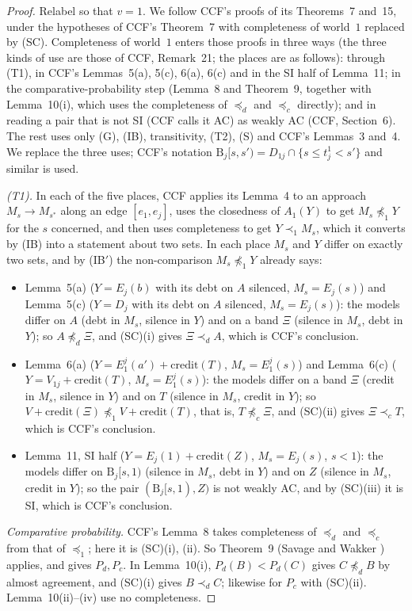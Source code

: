 \documentclass[11pt]{article}
\theoremstyle{definition}\newtheorem{definition}[theorem]{Definition}
\theoremstyle{remark}\newtheorem{remark}[theorem]{Remark}
\newcommand{\cred}{\mathrm{credit}}
\newcommand{\Band}{\mathrm B}
\begin{document}
\begin{proof}
Relabel so that $v=1$. We follow CCF's proofs of its Theorems~7 and~15,
under the hypotheses of CCF's Theorem~7 with completeness of world~$1$
replaced by (SC). Completeness of world~$1$ enters those proofs in
three ways (the three kinds of use are those of CCF, Remark~21; the places are as follows): through (T1), in CCF's Lemmas~5(a), 5(c), 6(a),
6(c) and in the SI half of Lemma~11; in the comparative-probability step
(Lemma~8 and Theorem~9, together with Lemma~10(i), which uses the
completeness of $\preceq_d$ and $\preceq_c$ directly); and in reading a pair
that is not SI (CCF calls it AC) as weakly AC (CCF, Section~6). The rest uses only (G), (IB), transitivity,
(T2), (S) and CCF's Lemmas~3 and~4. We replace the three uses; CCF's
notation $\Band_j[s,s')=D_{1j}\cap\{s\le t^1_j<s'\}$ and similar is used.

\emph{(T1).} In each of the five places, CCF applies its Lemma~4 to an
approach $M_s\to M_{s^*}$ along an edge $[e_1,e_j]$, uses the closedness of
$A_1(Y)$ to get $M_s\not\preceq_1Y$ for the $s$ concerned, and then uses
completeness to get $Y\prec_1M_s$, which it converts by (IB) into a
statement about two sets. In each place $M_s$ and $Y$ differ on exactly two
sets, and by (IB$'$) the non-comparison $M_s\not\preceq_1Y$ already says:
\begin{itemize}[leftmargin=*,itemsep=1pt]
\item Lemma~5(a) ($Y=E_j(b)$ with its debt on $A$ silenced, $M_s=E_j(s)$)
and Lemma~5(c) ($Y=D_j$ with its debt on $A$ silenced, $M_s=E_j(s)$): the
models differ on $A$ (debt in $M_s$, silence in $Y$) and on a band $\Xi$
(silence in $M_s$, debt in $Y$); so $A\not\preceq_d\Xi$, and (SC)(i) gives
$\Xi\prec_dA$, which is CCF's conclusion.
\item Lemma~6(a) ($Y=E^j_1(a')+\cred(T)$, $M_s=E^j_1(s)$) and Lemma~6(c)
($Y=V_{1j}+\cred(T)$, $M_s=E^j_1(s)$): the models differ on a band $\Xi$
(credit in $M_s$, silence in $Y$) and on $T$ (silence in $M_s$, credit in
$Y$); so $V+\cred(\Xi)\not\preceq_1V+\cred(T)$, that is, $T\not\preceq_c\Xi$,
and (SC)(ii) gives $\Xi\prec_cT$, which is CCF's conclusion.
\item Lemma~11, SI half ($Y=E_j(1)+\cred(Z)$, $M_s=E_j(s)$, $s<1$): the
models differ on $\Band_j[s,1)$ (silence in $M_s$, debt in $Y$) and on $Z$
(silence in $M_s$, credit in $Y$); so the pair $(\Band_j[s,1),Z)$ is not
weakly AC, and by (SC)(iii) it is SI, which is CCF's conclusion.
\end{itemize}
\emph{Comparative probability.} CCF's Lemma~8 takes completeness of
$\preceq_d$ and $\preceq_c$ from that of $\preceq_1$; here it is (SC)(i),
(ii). So Theorem~9 (Savage and Wakker \cite{Savage,Wakker}) applies, and
gives $P_d,P_c$. In Lemma~10(i), $P_d(B)<P_d(C)$ gives $C\not\preceq_dB$ by
almost agreement, and (SC)(i) gives $B\prec_dC$; likewise for $P_c$ with
(SC)(ii). Lemma~10(ii)--(iv) use no completeness.


\end{proof}
\end{document}
